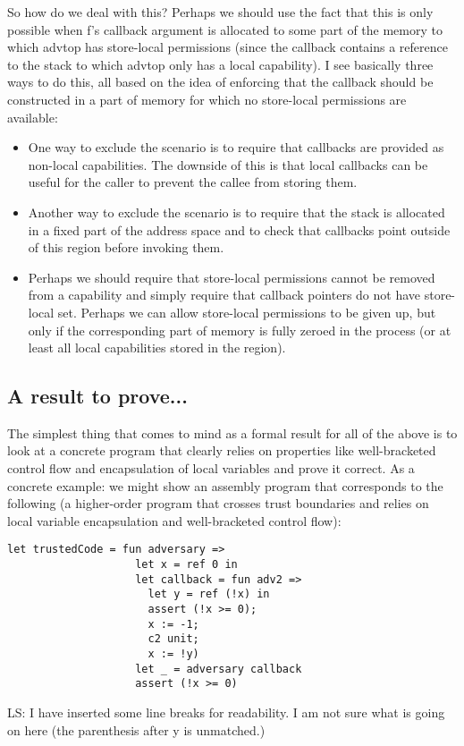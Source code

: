 \documentclass{article}
\newcommand\lau[1]{{\color{purple} \sf \footnotesize {LS: #1}}\\}
\begin{document}
So how do we deal with this? Perhaps we should use the fact that this is only
possible when f's callback argument is allocated to some part of the memory to
which advtop has store-local permissions (since the callback contains a
reference to the stack to which advtop only has a local capability). I see
basically three ways to do this, all based on the idea of enforcing that the
callback should be constructed in a part of memory for which no store-local
permissions are available:
\begin{itemize}
\item One way to exclude the scenario is to require that callbacks are provided
  as non-local capabilities. The downside of this is that local callbacks can be
  useful for the caller to prevent the callee from storing them.
\item Another way to exclude the scenario is to require that the stack is
  allocated in a fixed part of the address space and to check that callbacks
  point outside of this region before invoking them.
\item Perhaps we should require that store-local permissions cannot be removed
  from a capability and simply require that callback pointers do not have
  store-local set. Perhaps we can allow store-local permissions to be given up,
  but only if the corresponding part of memory is fully zeroed in the process
  (or at least all local capabilities stored in the region).
\end{itemize}

\subsection{A result to prove...}
\label{sec:os-less-stack-property}

The simplest thing that comes to mind as a formal result for all of the above is
to look at a concrete program that clearly relies on properties like
well-bracketed control flow and encapsulation of local variables and prove it
correct. As a concrete example: we might show an assembly program that
corresponds to the following (a higher-order program that crosses trust
boundaries and relies on local variable encapsulation and well-bracketed control
flow):
\begin{verbatim}
let trustedCode = fun adversary =>
                    let x = ref 0 in
                    let callback = fun adv2 => 
                      let y = ref (!x) in 
                      assert (!x >= 0); 
                      x := -1; 
                      c2 unit; 
                      x := !y)
                    let _ = adversary callback
                    assert (!x >= 0)
\end{verbatim}
\lau{I have inserted some line breaks for readability. I am not sure what is going on here (the parenthesis after y is unmatched.)}
\end{document}
